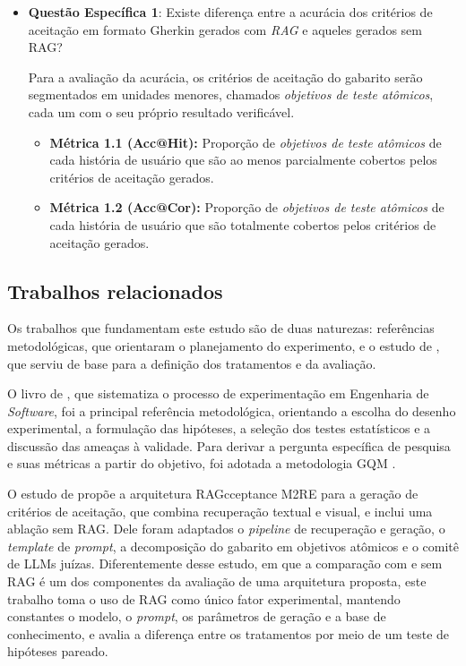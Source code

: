 \begin{itemize}
    \item \textbf{Questão Específica 1}: 
    Existe diferença entre a acurácia dos critérios de aceitação em formato Gherkin gerados com \textit{RAG} e aqueles gerados sem RAG?

    Para a avaliação da acurácia, os critérios de aceitação do gabarito serão segmentados em unidades menores, chamados \textit{objetivos de teste atômicos}, cada um com o seu próprio resultado verificável.
    
    \begin{itemize}
        \item \textbf{Métrica 1.1 (Acc@Hit):} Proporção de \textit{objetivos de teste atômicos} de cada história de usuário que são ao menos parcialmente cobertos pelos critérios de aceitação gerados.  
        \item \textbf{Métrica 1.2 (Acc@Cor):} Proporção de \textit{objetivos de teste atômicos} de cada história de usuário que são totalmente cobertos pelos critérios de aceitação gerados.
    \end{itemize}
\end{itemize}

\subsection{Trabalhos relacionados}
Os trabalhos que fundamentam este estudo são de duas naturezas: referências metodológicas, que orientaram o planejamento do experimento, e o estudo de , que serviu de base para a definição dos tratamentos e da avaliação.

O livro de , que sistematiza o processo de experimentação em Engenharia de \textit{Software}, foi a principal referência metodológica, orientando a escolha do desenho experimental, a formulação das hipóteses, a seleção dos testes estatísticos e a discussão das ameaças à validade. Para derivar a pergunta específica de pesquisa e suas métricas a partir do objetivo, foi adotada a metodologia GQM \cite{basili1994}.

O estudo de  propõe a arquitetura RAGcceptance M2RE para a geração de critérios de aceitação, que combina recuperação textual e visual, e inclui uma ablação sem RAG. Dele foram adaptados o \textit{pipeline} de recuperação e geração, o \textit{template} de \textit{prompt}, a decomposição do gabarito em objetivos atômicos e o comitê de LLMs juízas. Diferentemente desse estudo, em que a comparação com e sem RAG é um dos componentes da avaliação de uma arquitetura proposta, este trabalho toma o uso de RAG como único fator experimental, mantendo constantes o modelo, o \textit{prompt}, os parâmetros de geração e a base de conhecimento, e avalia a diferença entre os tratamentos por meio de um teste de hipóteses pareado.

